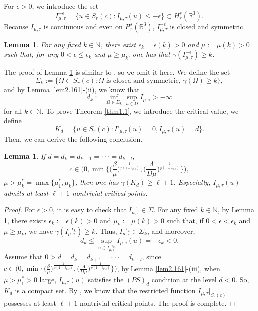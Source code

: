 \documentclass[10pt,a4paper]{amsart}
\numberwithin{equation}{section}
\newtheorem{lemma}[theorem]{Lemma}
\begin{document}
For $\epsilon >0$, we introduce the set
$$
I^{-\epsilon}_{\mu, \tau}=\{u\in  S_{r}(c):I_{\mu, \tau}(u)\leq -\epsilon\}
\subset H^s_{r}(\mathbb{R}^3).
$$
Because $I_{\mu, \tau}$ is continuous and even on $H^s_{r}(\mathbb{R}^3)$, 
$I^{-\epsilon}_{\mu, \tau}$ is closed and symmetric.

\begin{lemma}\label{lem4.4}
For any fixed $k\in \mathbb{N}$, there exist $\epsilon_k=\epsilon(k)>0$ and 
$\mu:=\mu(k)>0$ such that, for any $0<\epsilon\leq\epsilon_k$ and $\mu \geq \mu_k$, 
one has that $\gamma(I^{-\epsilon}_{\mu, \tau})\geq k$.
\end{lemma}

The proof of Lemma \ref{lem4.4} is similar to \cite[Lemma 3.2]{A5878}, 
so we omit it here.
We define the set
$$
\Sigma_k:=\{\Omega \subset   S_{r}(c): \Omega \text{ is  closed and symmetric, }
\gamma(\Omega)\geq k\},
$$ 
and by Lemma \ref{lem2.161}-(ii), we know that
$$
d_k:=\inf_{\Omega\in \Sigma_k}\sup_{u\in \Omega}I_{\mu, \tau}>-\infty
$$
for all $k\in \mathbb{N}$. To prove Theorem \ref{thm1.1}, we introduce the critical 
value, we define
$$
K_d=\{u\in   S_{r}(c): I'_{\mu, \tau}(u)=0, I_{\mu, \tau}(u)=d\}.
$$
Then, we can derive the following conclusion.

\begin{lemma}\label{lem4.5}
If $d=d_k=d_{k+1}=\cdot\cdot\cdot=d_{k+l}$, 
\[
c\in\Big(0, \min\Big\{\big(\frac{\beta}{\mu}\big)^{\frac{1}{p(1-\delta_{p,s})}}, 
\big(\frac{\Lambda}{D\mu}\big)^{\frac{1}{p(1-\delta_{p,s})}}\Big\}\Big),
\]
$\mu> \mu^*_k=\max\{\mu^*_1, \mu_k\}$, then one has $\gamma(K_d)\geq \ell+1$. 
Especially, $I_{\mu, \tau}(u)$ admits at least $\ell+1$ nontrivial critical points.
\end{lemma}

\begin{proof} For $\epsilon>0$, it is easy to check that 
$I^{-\epsilon}_{\mu, \tau}\in \Sigma$. For any fixed $k\in\mathbb{N}$, by Lemma 
\ref{lem4.4}, there exists $\epsilon_k:=\epsilon(k)>0$ and $\mu_k:=\mu(k)>0$ such that, 
if $0<\epsilon<\epsilon_k$ and $\mu\geq\mu_k$, we have
 $\gamma(I^{-\epsilon_k}_{\mu, \tau})\geq k$. 
 Thus, $I^{-\epsilon_k}_{\mu, \tau}\in \Sigma_k$, and moreover,
$$
d_k\leq \sup_{u\in I^{-\epsilon_k}_{\mu, \tau} }I_{\mu, \tau}(u)=-\epsilon_k<0.
$$
Assume that $0>d=d_k=d_{k+1}=\cdot\cdot\cdot=d_{k+l}$, since 
$c\in\Big(0, \min\Big\{\big(\frac{\beta}{\mu}\big)^{\frac{1}{p(1-\delta_{p,s})}}, 
\big(\frac{\Lambda}{D\mu}\big)^{\frac{1}{p(1-\delta_{p,s})}}\Big\}\Big)$, 
 by  Lemma \ref{lem2.161}-(iii), when $\mu>\mu^*_1>0$ large,   
$I_{\mu, \tau}(u)$ satisfies the $(PS)_d$ condition at the level $d<0$. 
So, $K_d$ is a compact set. By  \cite[Theorem 2.1]{L5898}, we know that the 
restricted function $I_{\mu, \tau}|_{S_r(c)}$ possesses at least $\ell+1$ 
nontrivial critical points. The proof is complete.
\end{proof}
\end{document}
